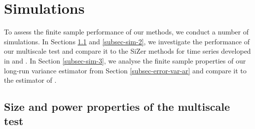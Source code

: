 
\section{Simulations}\label{sec-sim}


To assess the finite sample performance of our methods, we conduct a number of simulations. In Sections \ref{subsec-sim-1} and \ref{subsec-sim-2}, we investigate the performance of our multiscale test and compare it to the SiZer methods for time series developed in \cite{Rondonotti2004} and \cite{Rondonotti2007}. In Section \ref{subsec-sim-3}, we analyse the finite sample properties of our long-run variance estimator from Section \ref{subsec-error-var-ar} and compare it to the estimator of \cite{Hall2003}. 


\subsection{Size and power properties of the multiscale test}\label{subsec-sim-1} 


